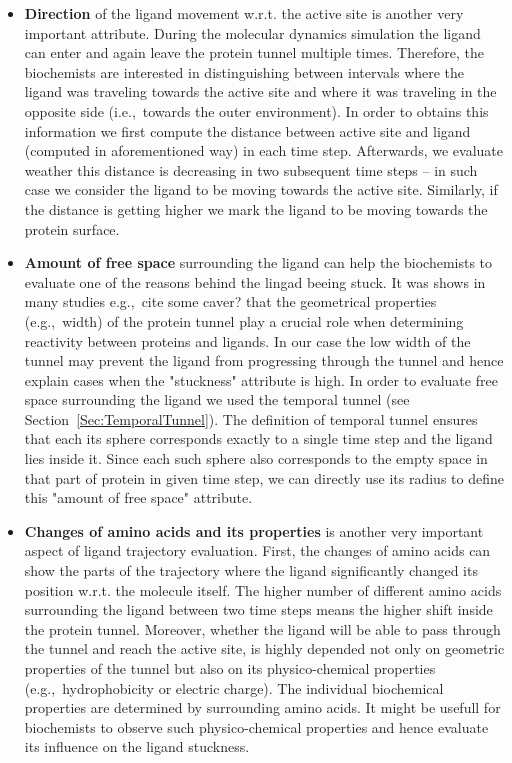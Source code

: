 \documentclass[twocolumn]{bmcart}%
\newcommand{\ie}{i.e.,~}
\newcommand{\eg}{e.g.,~}
\begin{document}
\begin{itemize}
\item \textbf{Direction} of the ligand movement w.r.t. the active site is another very important attribute. 
During the molecular dynamics simulation the ligand can enter and again leave the protein tunnel multiple times. 
Therefore, the biochemists are interested in distinguishing between intervals where the ligand was traveling towards the active site and where it was traveling in the opposite side (\ie towards the outer environment). 
In order to obtains this information we first compute the distance between active site and ligand (computed in aforementioned way) in each time step. 
Afterwards, we evaluate weather this distance is decreasing in two subsequent time steps -- in such case we consider the ligand to be moving towards the active site. 
Similarly, if the distance is getting higher we mark the ligand to be moving towards the protein surface.        

\item \textbf{Amount of free space} surrounding the ligand can help the biochemists to evaluate one of the reasons behind the lingad beeing stuck. 
It was shows in many studies {\color{red}\eg cite some caver?} that the geometrical properties (\eg width) of the protein tunnel play a crucial role when determining reactivity between proteins and ligands. 
In our case the low width of the tunnel may prevent the ligand from progressing through the tunnel and hence explain cases when the "stuckness" attribute is high. 
In order to evaluate free space surrounding the ligand we used the temporal tunnel (see Section~\ref{Sec:TemporalTunnel}). 
The definition of temporal tunnel ensures that each its sphere corresponds exactly to a single time step and the ligand lies inside it. 
Since each such sphere also corresponds to the empty space in that part of protein in given time step, we can directly use its radius to define this "amount of free space" attribute. 

\item \textbf{Changes of amino acids and its properties} is another very important aspect of ligand trajectory evaluation.
First, the changes of amino acids can show the parts of the trajectory where the ligand  significantly changed its position w.r.t. the molecule itself. 
The higher number of different amino acids surrounding the ligand between two time steps means the higher shift inside the protein tunnel.
Moreover, whether the ligand will be able to pass through the tunnel and reach the active site, is highly depended not only on geometric properties of the tunnel but also on its physico-chemical properties (\eg hydrophobicity or electric charge).
The individual biochemical properties are determined by surrounding amino acids.
It might be usefull for biochemists to observe such physico-chemical properties and hence evaluate its influence on the ligand stuckness.  


\end{itemize}
\end{document}
